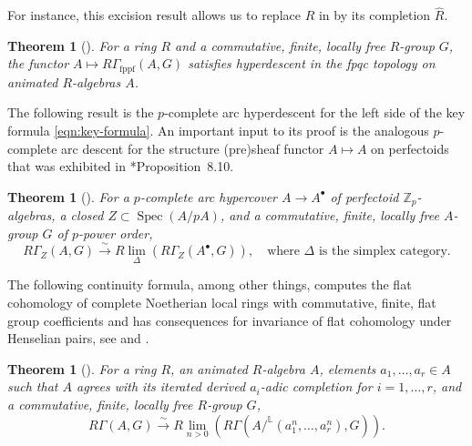 \documentclass[11pt, reqno]{amsart}
\newcommand{\bL}{\mathbb{L}}
\newcommand{\bZ}{\mathbb{Z}}
\DeclareMathOperator{\Spec}{Spec}		%
\newcommand{\fppf}{\mathrm{fppf}}		%
\newcommand{\fpqc}{\mathrm{fpqc}}		%
\newcommand{\isomto}{\overset{\sim}{\longrightarrow}}
\providecommand{\p}[1]{\left(#1\right)}
\newcommand{\ra}{\rightarrow}
\newcommand{\wh}{\widehat}
\providecommand{\qx}[1]{\quad\text{#1}}
\newcommand{\tst}{\textstyle}
\newcommand{\bthm}{\begin{thm}}
\newcommand{\ethm}{\end{thm}}
\numberwithin{equation}{numberingbase}
\theoremstyle{thms}
\newtheorem{thm}[numberingbase]{Theorem}
\theoremstyle{claims}
\theoremstyle{defs}
\theoremstyle{thms}
\theoremstyle{defs}
\theoremstyle{subsection-tweak}
\theoremstyle{subsection-tweak}
\begin{document}
For instance, this excision result allows us to replace $R$ in  by its completion $\wh{R}$.

\bthm[] \label{thm:fppf-fpqc-ann}
For a ring $R$ and a commutative, finite, locally free $R$-group $G$, the functor $A \mapsto R\Gamma_\fppf(A, G)$ satisfies hyperdescent in the fpqc topology on animated $R$-algebras $A$.
\ethm

The following result is the $p$-complete arc hyperdescent for the left side of the key formula \eqref{eqn:key-formula}. An important input to its proof is the analogous $p$-complete arc descent for the structure (pre)sheaf functor $A \mapsto A$ on perfectoids that was exhibited in \cite{BS19}*{Proposition~8.10}.





\bthm[] \label{thm:descent-ann}
For a $p$-complete arc hypercover $A \ra A^\bullet$  %
of perfectoid $\bZ_p$-algebras, a closed $Z \subset \Spec(A/pA)$, and a commutative, finite, locally free $A$-group $G$ of $p$-power order,
\[
\tst R\Gamma_Z(A, G) \isomto R\lim_{\Delta} \p{R\Gamma_Z(A^\bullet, G)}\!, \qx{where $\Delta$ is the simplex category.}
\]
\ethm



The following continuity formula, among other things, computes the flat cohomology of complete Noetherian local rings with commutative, finite, flat group coefficients and has consequences for invariance of flat cohomology under Henselian pairs, see  and .

\bthm[] \label{adic-continuity-ann}
For a ring $R$, an animated $R$-algebra $A$, elements $a_1, \dotsc, a_r \in A$ such that $A$ agrees with its iterated derived $a_i$-adic completion for $i = 1, \dotsc, r$, and a commutative, finite, locally free $R$-group $G$,
\[
\tst R\Gamma(A, G) \isomto R\lim_{n > 0} (R\Gamma(A/^\bL (a_1^n, \dotsc, a_r^n), G)). 
\]
\ethm
\end{document}
